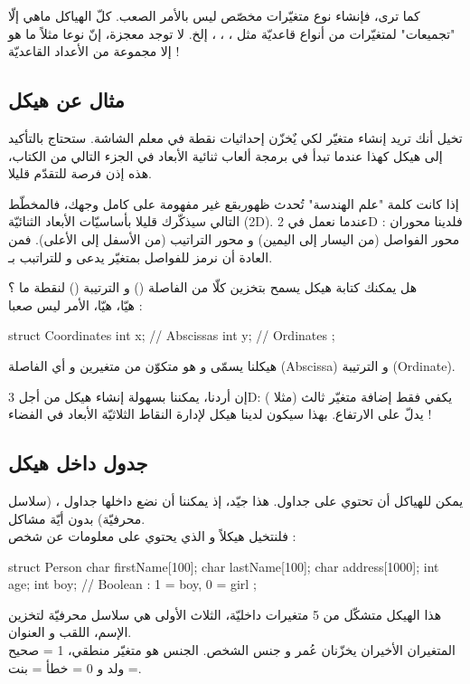 كما ترى، فإنشاء نوع متغيّرات مخصّص ليس بالأمر الصعب. كلّ الهياكل ماهي إلّا "تجميعات" لمتغيّرات من أنواع قاعديّة مثل
، ، ،
إلخ. لا توجد معجزة، إنّ نوعا
مثلاً ما هو إلا مجموعة من الأعداد القاعديّة !

\subsection{مثال عن هيكل}
تخيل أنك تريد إنشاء متغيّر لكي يٌخزّن إحداثيات نقطة في معلم الشاشة. ستحتاج بالتأكيد إلى هيكل كهذا عندما تبدأ في برمجة ألعاب ثنائية الأبعاد في الجزء التالي من الكتاب، هذه إذن فرصة للتقدّم قليلا.

إذا كانت كلمة "علم الهندسة" تُحدث ظهوربقع غير مفهومة على كامل وجهك، فالمخطّط التالي سيذكّرك قليلا بأساسيّات الأبعاد الثنائيّة (\textenglish{2D}).
عندما نعمل في
\textenglish{2D}
فلدينا محوران : محور الفواصل (من اليسار إلى اليمين) و محور التراتيب (من الأسفل إلى الأعلى). فمن العادة أن نرمز للفواصل بمتغيّر يدعى
و للتراتبب بـ.

هل يمكنك كتابة هيكل
يسمح بتخزين كلّا من الفاصلة
()
و الترتيبة
()
لنقطة ما ؟\\
هيّا، هيّا، الأمر ليس صعبا :
\begin{Csource}
struct Coordinates
{
	int x; // Abscissas
	int y; // Ordinates
};
\end{Csource}
هيكلنا يسمّى
و هو متكوّن من متغيرين
و
أي الفاصلة
(\textenglish{Abscissa})
و الترتيبة
(\textenglish{Ordinate}).

إن أردنا، يمكننا بسهولة إنشاء هيكل
من أجل
\textenglish{3D}:
يكفي فقط إضافة متغيّر ثالث (مثلا
)
يدلّ على الارتفاع. بهذا سيكون لدينا هيكل لإدارة النقاط الثلاثيّة الأبعاد في الفضاء !

\subsection{جدول داخل هيكل}
يمكن للهياكل أن تحتوي على جداول. هذا جيّد، إذ يمكننا أن نضع داخلها جداول
،
(سلاسل محرفيّة) بدون أيّة مشاكل.\\
فلنتخيل هيكلاً
و الذي يحتوي على معلومات عن شخص :
\begin{Csource}
struct Person
{
	char firstName[100];
	char lastName[100];
	char address[1000];
	int age;
	int boy; // Boolean : 1 = boy, 0 = girl
};
\end{Csource}
هذا الهيكل متشكّل من 5 متغيرات داخليّة، الثلاث الأولى هي سلاسل محرفيّة لتخزين الإسم، اللقب و العنوان.\\
المتغيران الأخيران يخزّنان عُمر و جنس الشخص. الجنس هو متغيّر منطقي، 1 = صحيح = ولد و 0 = خطأ = بنت.

